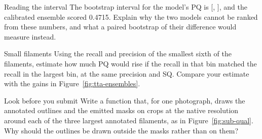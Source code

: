 \begin{exercise}{Reading the interval}
The bootstrap interval for the model's PQ is [\PQLow{}, \PQHigh{}], and the calibrated ensemble scored
0.4715. Explain why the two models cannot be ranked from these numbers, and what a paired bootstrap of
their difference would measure instead.
\end{exercise}

\begin{exercise}{Small filaments}
Using the recall and precision of the smallest sixth of the filaments, estimate how much PQ would rise
if the recall in that bin matched the recall in the largest bin, at the same precision and SQ. Compare
your estimate with the gains in Figure~\ref{fig:tta-ensembles}.
\end{exercise}

\begin{exercise}{Look before you submit}
Write a function that, for one photograph, draws the annotated outlines and the emitted masks on crops at
the native resolution around each of the three largest annotated filaments, as in
Figure~\ref{fig:sub-qual}. Why should the outlines be drawn outside the masks rather than on them?
\end{exercise}
